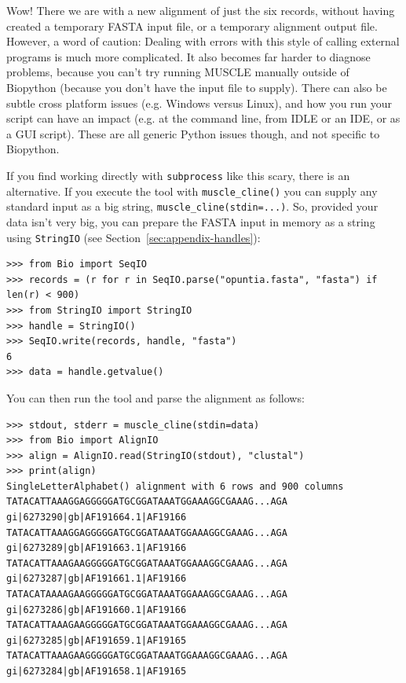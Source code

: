 \documentclass{report}
\begin{document}
Wow! There we are with a new alignment of just the six records, without having created
a temporary FASTA input file, or a temporary alignment output file. However, a word of
caution: Dealing with errors with this style of calling external programs is much more
complicated.
It also becomes far harder to diagnose problems, because you can't try running MUSCLE
manually outside of Biopython (because you don't have the input file to supply).
There can also be subtle cross platform issues (e.g. Windows versus Linux), and how
you run your script can have an impact (e.g. at the command line, from IDLE or an
IDE, or as a GUI script). These are all generic Python issues though, and not
specific to Biopython.

If you find working directly with \texttt{subprocess} like this scary, there is an
alternative. If you execute the tool with \texttt{muscle\_cline()} you can supply
any standard input as a big string, \texttt{muscle\_cline(stdin=...)}. So,
provided your data isn't very big, you can prepare the FASTA input in memory as
a string using \texttt{StringIO} (see Section~\ref{sec:appendix-handles}):

\begin{verbatim}
>>> from Bio import SeqIO
>>> records = (r for r in SeqIO.parse("opuntia.fasta", "fasta") if len(r) < 900)
>>> from StringIO import StringIO
>>> handle = StringIO()
>>> SeqIO.write(records, handle, "fasta")
6
>>> data = handle.getvalue()
\end{verbatim}

\noindent You can then run the tool and parse the alignment as follows:

\begin{verbatim}
>>> stdout, stderr = muscle_cline(stdin=data)
>>> from Bio import AlignIO
>>> align = AlignIO.read(StringIO(stdout), "clustal")
>>> print(align)
SingleLetterAlphabet() alignment with 6 rows and 900 columns
TATACATTAAAGGAGGGGGATGCGGATAAATGGAAAGGCGAAAG...AGA gi|6273290|gb|AF191664.1|AF19166
TATACATTAAAGGAGGGGGATGCGGATAAATGGAAAGGCGAAAG...AGA gi|6273289|gb|AF191663.1|AF19166
TATACATTAAAGAAGGGGGATGCGGATAAATGGAAAGGCGAAAG...AGA gi|6273287|gb|AF191661.1|AF19166
TATACATAAAAGAAGGGGGATGCGGATAAATGGAAAGGCGAAAG...AGA gi|6273286|gb|AF191660.1|AF19166
TATACATTAAAGAAGGGGGATGCGGATAAATGGAAAGGCGAAAG...AGA gi|6273285|gb|AF191659.1|AF19165
TATACATTAAAGAAGGGGGATGCGGATAAATGGAAAGGCGAAAG...AGA gi|6273284|gb|AF191658.1|AF19165
\end{verbatim}
\end{document}
